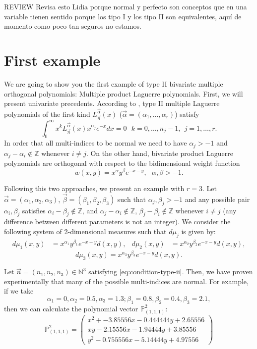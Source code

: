 \documentclass[12pt,a4]{article}
\theoremstyle{plain}
\newcommand{\N}[0]{\mathbb{N}}
\newcommand{\Z}[0]{\mathbb{Z}}
\newcommand{\cb}[1]{{\color{blue}#1}}
\begin{document}
\cb{REVIEW Revisa esto Lidia porque normal y perfecto son conceptos que en una variable tienen sentido porque los tipo I y los tipo II son equivalentes, aquí de momento como poco tan seguros no estamos.}


\section{First example}

We are going to show you the first example of type II bivariate multiple orthogonal polynomials: Multiple product Laguerre polynomials. First, we will present univariate precedents. According to \cite[Page 658, Section 3.6.1]{foupouagnigni-2020}, type II multiple Laguerre polynomials of the first kind $L_{\vec n}^{\vec\alpha}(x)$ ($\vec\alpha=(\alpha_1,\dots,\alpha_r)$) satisfy
\begin{equation}
    \int_0^\infty x^k L_{\vec n}^{\vec\alpha}(x) x^{\alpha_j} e^{-x} dx =0 \ \ \ k=0,\dots, n_j-1, \ \ j=1,\dots,r. 
\end{equation}
In order that all multi-indices to be normal we need to have $\alpha_j>-1$ and $\alpha_j- \alpha_i\not\in\Z$ whenever $i\neq j$. On the other hand, bivariate product Laguerre polynomials \cite[Ch. II, Section 2.2]{dunkl_xu_2014} are orthogonal with respect to the bidimensional weight function
$$w(x,y)=x^\alpha y^\beta e^{-x-y}, \ \ \ \alpha,\beta>-1.$$ 

Following this two approaches, we present an example with $r=3$. Let $\vec\alpha=(\alpha_1,\alpha_2,\alpha_3)$, $\vec\beta=(\beta_1,\beta_2,\beta_3)$ such that $\alpha_j,\beta_j > -1$ and any possible pair $\alpha_i,\beta_j$ satisfies $\alpha_i-\beta_j\not\in\Z$, and  $\alpha_j- \alpha_i\not\in\Z$, $\beta_j- \beta_i\not\in\Z$ whenever $i\neq j$ (any difference between different parameters is not an integer). We consider the following system of 2-dimensional measures such that $d\mu_j$ is given by:
\begin{align}
    d\mu_1(x,y) &= x^{\alpha_1} y^{\beta_1} e^{-x-y} d(x,y), & d\mu_2(x,y) &= x^{\alpha_2} y^{\beta_2} e^{-x-y} d(x,y),
\end{align}
$$d\mu_3(x,y) = x^{\alpha_3} y^{\beta_3} e^{-x-y} d(x,y).$$

Let $\vec n=(n_1,n_2,n_3)\in\N^3$ satisfying \eqref{eq:condition-type-ii}. Then, we have proven experimentally that many of the possible multi-indices are normal. For example, if we take $$\alpha_1 = 0, \alpha_2 = 0.5, \alpha_3 = 1.3; \beta_1 = 0.8, \beta_2 = 0.4, \beta_3 = 2.1,$$ then we can calculate the polynomial vector $\mathbb P_{(1,1,1)}^2$:
$$
\mathbb P_{(1,1,1)}^2 = \begin{pmatrix}
    x^2 + - 3.85556 x - 0.444444 y + 2.65556 \\ x y - 2.15556 x - 1.94444 y + 3.85556 \\  y^2 - 0.755556 x - 5.14444 y + 4.97556
\end{pmatrix}
$$
\end{document}
